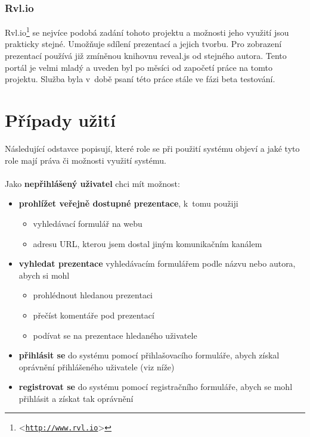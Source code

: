 \documentclass[11pt,twoside,a4paper]{book}
\let\oldUrl\url									%
\renewcommand\url[1]{<\texttt{\oldUrl{#1}}>}
\begin{document}
\subsection{Rvl.io}
Rvl.io\footnote{\url{http://www.rvl.io}} se nejvíce podobá zadání tohoto projektu a možnosti jeho využití jsou prakticky stejné. Umožňuje sdílení prezentací a jejich tvorbu. Pro zobrazení prezentací používá již zmíněnou knihovnu reveal.js od stejného autora. Tento portál je velmi mladý a uveden byl po měsíci od započetí práce na tomto projektu. Služba byla v~době psaní této práce stále ve fázi beta testování.


\chapter{Případy užití}
Následující odstavce popisují, které role se při použití systému objeví a jaké tyto role mají práva či možnosti využití systému.\\\\

\noindent Jako \textbf{nepřihlášený uživatel} chci mít možnost:
\begin{itemize}
	\item \textbf{prohlížet veřejně dostupné prezentace}, k~tomu použiji 
		\begin{itemize}
			\item vyhledávací formulář na webu
			\item adresu URL, kterou jsem dostal jiným komunikačním kanálem
		\end{itemize}
	\item \textbf{vyhledat prezentace} vyhledávacím formulářem podle názvu nebo autora, abych si mohl
		\begin{itemize}
			\item prohlédnout hledanou prezentaci
			\item přečíst komentáře pod prezentací
			\item podívat se na prezentace hledaného uživatele
		\end{itemize}
	\item \textbf{přihlásit se} do systému pomocí přihlašovacího formuláře, abych získal oprávnění přihlášeného uživatele (viz níže)
	\item \textbf{registrovat se} do systému pomocí registračního formuláře, abych se mohl přihlásit a získat tak oprávnění
\end{itemize}
\end{document}
